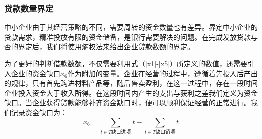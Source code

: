 \documentclass{my_paper}
\begin{document}
\subsubsection{贷款数量界定}
中小企业由于其经营策略的不同，需要周转的资金数量也有差异。界定中小企业的贷款需求，精准投放有限的资金储备，是银行需要解决的问题。在完成发放贷款与否的界定后，我们将使用熵权法来给出企业贷款数额的界定。

为了更好的判断借款数额，不仅需要利用式（\ref{x1}-\ref{x5}）所定义的数值，还需要引入企业的资金缺口$x_6$作为附加的变量。企业在经营的过程中，遵循着先投入后产出的规律，只有首先购进材料产品等，随后售卖盈利，在这一过程中，存在一段时间企业投入资金大于收入所得。在这段时间内产生的支出与获利之差我们定义为资金缺口。当企业获得贷款能够补齐资金缺口时，便可以顺利保证经营的正常进行。我们记录资金缺口为：
\begin{equation}
    x_6 =\sum\limits_{t\in T\text{缺口进项}}t-\sum\limits_{t\in T\text{缺口销项}}t
\label{x6}
\end{equation}
\end{document}
